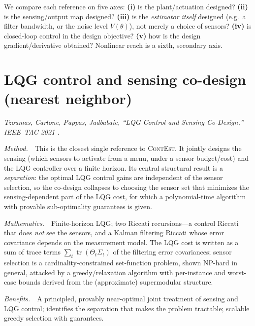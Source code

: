 \documentclass[11pt]{article}
\DeclareMathOperator{\tr}{tr}
\newcommand{\Th}{\theta}
\newcommand{\ContEst}{\textsc{ContEst}}
\newcommand{\Method}{\smallskip\noindent\textit{Method.}~}
\newcommand{\Maths}{\smallskip\noindent\textit{Mathematics.}~}
\newcommand{\Benefits}{\smallskip\noindent\textit{Benefits.}~}
\begin{document}
We compare each reference on five axes: \textbf{(i)} is the plant/actuation
designed? \textbf{(ii)} is the sensing/output map designed? \textbf{(iii)} is the
\emph{estimator itself} designed (e.g.\ a filter bandwidth, or the noise level
$V(\Th)$), not merely a choice of sensors? \textbf{(iv)} is closed-loop control in
the design objective? \textbf{(v)} how is the design gradient/derivative obtained?
Nonlinear reach is a sixth, secondary axis.

\section{LQG control and sensing co-design (nearest neighbor)}\label{sec:tzoumas21}
\noindent\emph{Tzoumas, Carlone, Pappas, Jadbabaie, ``LQG Control and Sensing
Co-Design,'' IEEE~TAC 2021 \cite{tzoumas2021lqg}.}

\Method\ This is the closest single reference to \ContEst. It jointly designs the
sensing (which sensors to activate from a menu, under a sensor budget/cost) and
the LQG controller over a finite horizon. Its central structural result is a
\emph{separation}: the optimal LQG control gains are independent of the sensor
selection, so the co-design collapses to choosing the sensor set that minimizes
the sensing-dependent part of the LQG cost, for which a polynomial-time algorithm
with provable sub-optimality guarantees is given.

\Maths\ Finite-horizon LQG; two Riccati recursions---a control Riccati that does
\emph{not} see the sensors, and a Kalman filtering Riccati whose error covariance
depends on the measurement model. The LQG cost is written as a sum of trace terms
$\sum_t \tr(\Theta_t \Sigma_{t})$ of the filtering error covariances; sensor
selection is a cardinality-constrained set-function problem, shown NP-hard in
general, attacked by a greedy/relaxation algorithm with per-instance and
worst-case bounds derived from the (approximate) supermodular structure.

\Benefits\ A principled, provably near-optimal joint treatment of sensing and LQG
control; identifies the separation that makes the problem tractable; scalable
greedy selection with guarantees.
\end{document}
